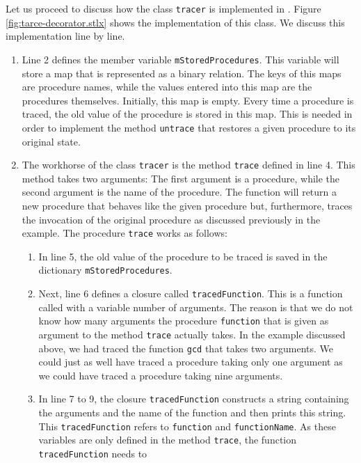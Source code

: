 Let us proceed to discuss how the class \texttt{tracer} is implemented in \setlx.  Figure
\ref{fig:tarce-decorator.stlx} shows the implementation of this class.  We discuss this
implementation line by line.
\begin{enumerate}
\item Line 2 defines the member variable \texttt{mStoredProcedures}.  This variable will store a map
      that is represented as a binary relation.  The keys of this maps are procedure names, while the
      values entered into this map are the procedures themselves.  Initially, this map is empty.  Every time a
      procedure is traced, the old value of the procedure is stored in this map.  This is needed in
      order to implement the method \texttt{untrace} that restores a given procedure to its original
      state.
\item The workhorse of the class \texttt{tracer} is the method \texttt{trace} defined in line 4.
      This method takes two arguments:  The first argument is a procedure, while the second argument
      is the name of the procedure.  The function will return a new procedure that behaves like the
      given procedure but, furthermore, traces the invocation of the original procedure as discussed
      previously in the example.  The procedure \texttt{trace} works as follows:
      \begin{enumerate}
      \item In line 5, the old value of the procedure to be traced is saved in the dictionary 
            \texttt{mStoredProcedures}.
      \item Next, line 6 defines a closure called \texttt{tracedFunction}.  This is a function    
            called with a variable number of arguments.  The reason is that we do
            not know how many 
            arguments the procedure \texttt{function} that is given as argument to the method
            \texttt{trace} actually takes.  In the example discussed above, we had traced the
            function \texttt{gcd} that takes two arguments.  We could just as well have traced a
            procedure taking only one argument as we could have traced a procedure taking nine
            arguments.
      \item In line 7 to 9, the closure \texttt{tracedFunction} constructs a string containing the
            arguments and the name of the function and then prints this string.  This
            \texttt{tracedFunction} refers to \texttt{function} and \texttt{functionName}.  As these
            variables  are only defined in the method \texttt{trace}, the function \texttt{tracedFunction} needs to

\end{enumerate}
\end{enumerate}
